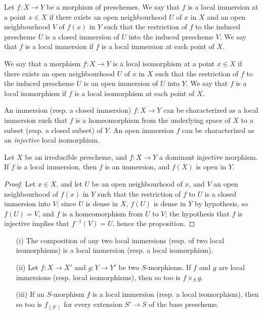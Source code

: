 \begin{definition}[4.5.1]
\label{I.4.5.1}
Let $f:X\to Y$ be a morphism of preschemes.
We say that $f$ is a local immersion at a point $x\in X$ if there exists an open neighbourhood $U$ of $x$ in $X$ and an open neighbourhood $V$ of $f(x)$ in $Y$ such that the restriction of $f$ to the induced prescheme $U$ is a closed immersion of $U$ into the induced prescheme $V$.
We say that $f$ is a local immersion if $f$ is a local immersion at each point of $X$.
\end{definition}

\begin{definition}[4.5.2]
\label{I.4.5.2}
We say that a morphism $f:X\to Y$ is a local isomorphism at
a point $x\in X$ if there exists an open neighbourhood $U$ of $x$ in $X$ such that the restriction of $f$ to the induced prescheme $U$ is an open immersion of $U$ into $Y$.
We say that $f$ is a local isomorphism if $f$ is a local isomorphism at each point of $X$.
\end{definition}

\begin{env}[4.5.3]
\label{I.4.5.3}
An immersion (resp. a closed immersion) $f:X\to Y$ can be characterized as a local immersion such that $f$ is a homeomorphism from the underlying space of $X$ to a subset (resp. a closed subset) of $Y$.
An open immersion $f$ can be characterized as an \emph{injective} local isomorphism.
\end{env}

\begin{proposition}[4.5.4]
\label{I.4.5.4}
Let $X$ be an irreducible prescheme, and $f:X\to Y$ a dominant injective morphism.
If $f$ is a local immersion, then $f$ is an immersion, and $f(X)$ is open in $Y$.
\end{proposition}

\begin{proof}
Let $x\in X$, and let $U$ be an open neighbourhood of $x$, and $V$ an open neighbourhood of $f(x)$ in $Y$ such that the restriction of $f$ to $U$ is a closed immersion into $V$;
since $U$ is dense in $X$, $f(U)$ is dense in $Y$ by hypothesis, so $f(U)=V$, and $f$ is a homeomorphism from $U$ to $V$;
the hypothesis that $f$ is injective implies that $f^{-1}(V)=U$, hence the proposition.
\end{proof}

\begin{proposition}[4.5.5]
\label{I.4.5.5}
\medskip\noindent
\begin{enumerate}
  \item[{\rm(i)}] The composition of any two local immersions (resp. of two local isomorphisms) is a local immersion (resp. a local isomorphism).
  \item[{\rm(ii)}] Let $f:X\to X'$ and $g:Y\to Y'$ be two $S$-morphisms.
    If $f$ and $g$ are local immersions (resp. local isomorphisms), then so too is $f\times_S g$.
  \item[{\rm(iii)}] If an $S$-morphism $f$ is a local immersion (resp. a local isomorphism), then so too is $f_{(S')}$ for every extension $S'\to S$ of the base prescheme.
\end{enumerate}
\end{proposition}


